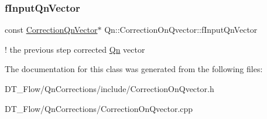 \subsubsection{\texorpdfstring{f\+Input\+Qn\+Vector}{fInputQnVector}}
{\footnotesize\ttfamily const \mbox{\hyperlink{classQn_1_1CorrectionQnVector}{Correction\+Qn\+Vector}}$\ast$ Qn\+::\+Correction\+On\+Qvector\+::f\+Input\+Qn\+Vector\hspace{0.3cm}{\ttfamily [protected]}}

! the previous step corrected \mbox{\hyperlink{namespaceQn}{Qn}} vector 

The documentation for this class was generated from the following files\+:\begin{DoxyCompactItemize}
\item 
D\+T\+\_\+\+Flow/\+Qn\+Corrections/include/Correction\+On\+Qvector.\+h\item 
D\+T\+\_\+\+Flow/\+Qn\+Corrections/Correction\+On\+Qvector.\+cpp\end{DoxyCompactItemize}
